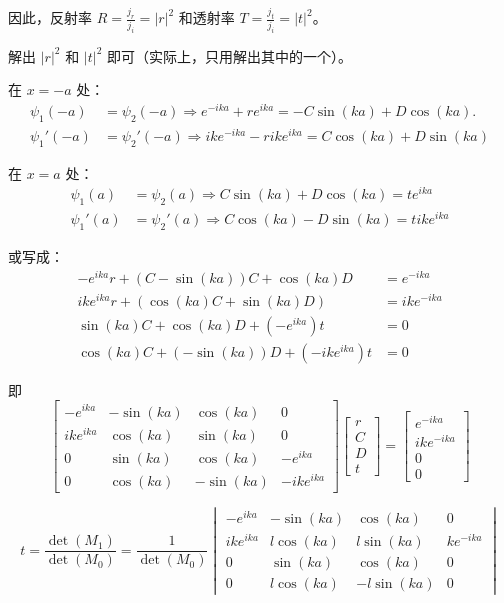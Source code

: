 \documentclass[lang=cn,10pt]{elegantbook}
\begin{document}
\begin{solution}
	因此，反射率 \( R = \frac{j_r}{j_i} = |r|^2 \) 和透射率 \( T = \frac{j_t}{j_i} = |t|^2 \)。
	
	解出 \( |r|^2 \) 和 \( |t|^2 \) 即可（实际上，只用解出其中的一个）。
	
	在 $x = -a$ 处：
	\begin{align*}
		\psi_1(-a) &= \psi_2(-a) \Rightarrow e^{-ika} + r e^{ika} = -C \sin(ka) + D \cos(ka). \tag{1} \\
		\psi_1'(-a) &= \psi_2'(-a) \Rightarrow ike^{-ika} - rik e^{ika} = C \cos(ka) + D \sin(ka) \tag{2}
	\end{align*}
	
	在 $x = a$ 处：
	\begin{align*}
		\psi_1(a) &= \psi_2(a) \Rightarrow C \sin(ka) + D \cos(ka) = t e^{ika} \tag{3} \\
		\psi_1'(a) &= \psi_2'(a) \Rightarrow C \cos(ka) - D \sin(ka) = tike^{ika} \tag{4}
	\end{align*}
	
	或写成：
	\begin{align*}
		-e^{ika} r + (C - \sin(ka)) C + \cos(ka) D &= e^{-ika} \\
		ike^{ika} r + (\cos(ka) C + \sin(ka) D) &= ike^{-ika} \\
		\sin(ka) C + \cos(ka) D + (-e^{ika}) t &= 0 \\
		\cos(ka) C + (-\sin(ka)) D + (-ike^{ika}) t &= 0
	\end{align*}
	
	即
	\[
	\begin{bmatrix}
		-e^{ika} & -\sin(ka) & \cos(ka) & 0 \\
		ike^{ika} & \cos(ka) & \sin(ka) & 0 \\
		0 & \sin(ka) & \cos(ka) & -e^{ika} \\
		0 & \cos(ka) & -\sin(ka) & -ike^{ika}
	\end{bmatrix}
	\begin{bmatrix}
		r \\
		C \\
		D \\
		t
	\end{bmatrix}
	=
	\begin{bmatrix}
		e^{-ika} \\
		ike^{-ika} \\
		0 \\
		0
	\end{bmatrix}
	\]
\end{solution}

\[
t = \frac{\det(M_1)}{\det(M_0)} = \frac{1}{\det(M_0)}
\begin{vmatrix}
	-e^{ika} & -\sin(ka) & \cos(ka) & 0 \\
	ike^{ika} & l\cos(ka) & l\sin(ka) & ke^{-ika} \\
	0 & \sin(ka) & \cos(ka) & 0 \\
	0 & l\cos(ka) & -l\sin(ka) & 0
\end{vmatrix}
\]
\end{document}
